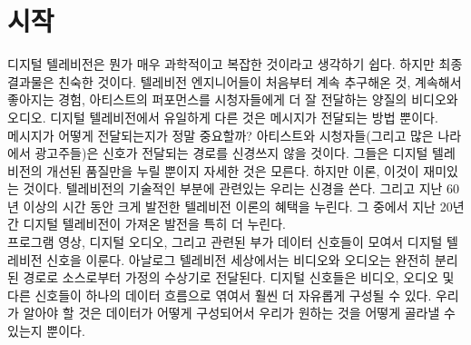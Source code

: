 \chapter{시작}
디지털 텔레비전은 뭔가 매우 과학적이고 복잡한 것이라고 생각하기 쉽다. 하지만 최종 결과물은 친숙한 것이다.
텔레비전 엔지니어들이 처음부터 계속 추구해온 것, 계속해서 좋아지는 경험, 아티스트의 퍼포먼스를 시청자들에게 더 잘 전달하는 양질의 비디오와 오디오.
디지털 텔레비전에서 유일하게 다른 것은 메시지가 전달되는 방법 뿐이다.
\\
메시지가 어떻게 전달되는지가 정말 중요할까? 아티스트와 시청자들(그리고 많은 나라에서 광고주들)은 신호가 전달되는 경로를 신경쓰지 않을 것이다.
그들은 디지털 텔레비전의 개선된 품질만을 누릴 뿐이지 자세한 것은 모른다. 하지만 이론, 이것이 재미있는 것이다.
텔레비전의 기술적인 부분에 관련있는 우리는 신경을 쓴다. 그리고 지난 60년 이상의 시간 동안 크게 발전한 텔레비전 이론의 혜택을 누린다.
그 중에서 지난 20년간 디지털 텔레비전이 가져온 발전을 특히 더 누린다.
\\
프로그램 영상, 디지털 오디오, 그리고 관련된 부가 데이터 신호들이 모여서 디지털 텔레비전 신호을 이룬다.
아날로그 텔레비전 세상에서는 비디오와 오디오는 완전히 분리된 경로로 소스로부터 가정의 수상기로 전달된다.
디지털 신호들은 비디오, 오디오 및 다른 신호들이 하나의 데이터 흐름으로 엮여서 훨씬 더 자유롭게 구성될 수 있다.
우리가 알아야 할 것은 데이터가 어떻게 구성되어서 우리가 원하는 것을 어떻게 골라낼 수 있는지 뿐이다.

